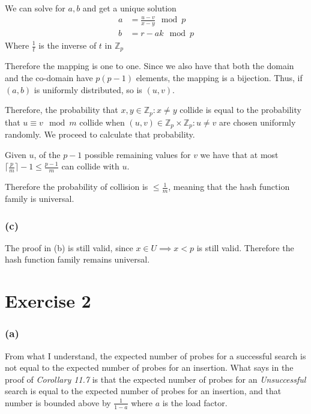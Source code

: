 \documentclass{article}
\begin{document}
We can solve for \(a, b\) and get a unique solution
\begin{align*}
    a &= \frac{u-v}{x-y} \mod{p}\\
    b &= r - ak \mod{p}
\end{align*}
Where \(\frac{1}{t}\) is the inverse of \(t\) in \(\mathbb{Z}_p\)

Therefore the mapping is one to one.
Since we also have that both the domain and the co-domain have
\(p(p-1)\) elements, the mapping is a bijection.
Thus, if \((a, b)\) is uniformly distributed, so is \((u, v)\).

Therefore, the probability that \(x, y \in \mathbb{Z}_p: x \neq y\) collide
is equal to the probability that \(u \equiv v \mod{m}\) collide
when \((u, v) \in \mathbb{Z}_p \times \mathbb{Z}_p: u \neq v\)
are chosen uniformly randomly.
We proceed to calculate that probability.

Given \(u\), of the \(p-1\) possible remaining values for \(v\) we have that
at most \(\lceil{\frac{p}{m}}\rceil - 1 \leq \frac{p-1}{m}\)
can collide with \(u\). 

Therefore the probability of collision is \(\leq \frac{1}{m}\),
meaning that the hash function family is universal.

\subsubsection*{(c)}

The proof in (b) is still valid,
since \(x \in U \implies x < p\) is still valid.
Therefore the hash function family remains universal.


\section*{Exercise 2}

\subsubsection*{(a)}

From what I understand,
the expected number of probes for a successful search is not equal to 
the expected number of probes for an insertion.
What \cite{clrs} says in the proof of \emph{Corollary 11.7} is that
the expected number of probes for an \emph{Unsuccessful} search is
equal to the expected number of probes for an insertion,
and that number is bounded above by \(\frac{1}{1-a}\)
where \(a\) is the load factor.
\end{document}
